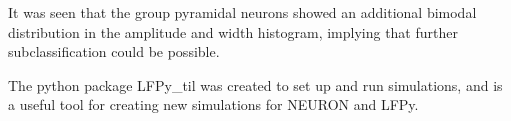 \documentclass[altfont, fleqn]{uiophd}
\begin{document}
It was seen that the group pyramidal neurons showed
an additional bimodal distribution in the amplitude and 
width histogram, 
implying that further subclassification could be possible. 

The python package 
LFPy\_til was created to set up and run simulations, 
and 
is a useful tool for creating new
simulations for NEURON and LFPy. 










\end{document}
